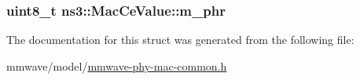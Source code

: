 \subsubsection[{\texorpdfstring{m\+\_\+phr}{m_phr}}]{\setlength{\rightskip}{0pt plus 5cm}uint8\+\_\+t ns3\+::\+Mac\+Ce\+Value\+::m\+\_\+phr}\hypertarget{structns3_1_1MacCeValue_a0f0480687827957b2680954767f262e7}{}\label{structns3_1_1MacCeValue_a0f0480687827957b2680954767f262e7}


The documentation for this struct was generated from the following file\+:\begin{DoxyCompactItemize}
\item 
mmwave/model/\hyperlink{mmwave-phy-mac-common_8h}{mmwave-\/phy-\/mac-\/common.\+h}\end{DoxyCompactItemize}
